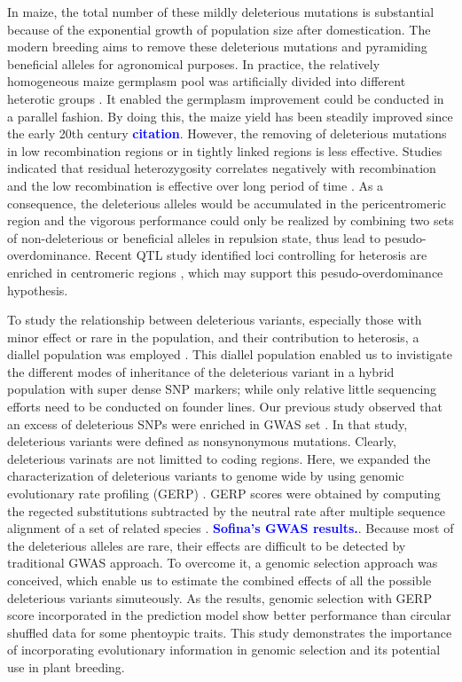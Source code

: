 \documentclass[10pt]{article}
\newcommand{\yang}[1]{\textcolor{blue}{\bf #1}}
\begin{document}
In maize, the total number of these mildly deleterious mutations is substantial because of the exponential growth of population size after domestication. The modern breeding aims to remove these deleterious mutations and pyramiding beneficial alleles for agronomical purposes. In practice, the relatively homogeneous maize germplasm pool was artificially divided into different heterotic groups \citep{Heerwaarden2012}. It enabled the germplasm improvement could be conducted in a parallel fashion. By doing this, the maize yield has been steadily improved since the early 20th century \yang{citation}. However, the removing of deleterious mutations in low recombination regions or in tightly linked regions is less effective. Studies indicated that residual heterozygosity correlates negatively with recombination \citep{Gore2009, McMullen2009} and the low recombination is effective over long period of time \citep{Haddrill2007}. As a consequence, the deleterious alleles would be accumulated in the pericentromeric region and the vigorous performance could only be realized by combining two sets of non-deleterious or beneficial alleles in repulsion state, thus lead to pesudo-overdominance. Recent QTL study identified loci controlling for heterosis are enriched in centromeric regions \citep{Lariepe2012}, which may support this pesudo-overdominance hypothesis.

To study the relationship between deleterious variants, especially those with minor effect or rare in the population, and their contribution to heterosis, a diallel population was employed \citep{}. This diallel population enabled us to invistigate the different modes of inheritance of the deleterious variant in a hybrid population with super dense SNP markers; while only relative little sequencing efforts need to be conducted on founder lines. Our previous study observed that an excess of deleterious SNPs were enriched in GWAS set \citep{Mezmouk2014}. In that study, deleterious variants were defined as nonsynonymous mutations. Clearly, deleterious varinats are not limitted to coding regions. Here, we expanded the characterization of deleterious variants to genome wide by using genomic evolutionary rate profiling (GERP) \citep{Cooper2005}. GERP scores were obtained by computing the regected substitutions subtracted by the neutral rate after multiple sequence alignment of a set of related species \citep{Davydov2010}. \yang{Sofina's GWAS results.}. Because most of the deleterious alleles are rare, their effects are difficult to be detected by traditional GWAS approach. To overcome it, a genomic selection approach was conceived, which enable us to estimate the combined effects of all the possible deleterious variants simuteously. As the results, genomic selection with GERP score incorporated in the prediction model show better performance than circular shuffled data for some phentoypic traits. This study demonstrates the importance of incorporating evolutionary information in genomic selection and its potential use in plant breeding.
   
\end{document}
